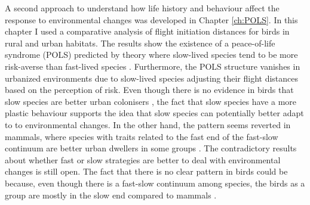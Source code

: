 A second approach to understand how life history and behaviour affect the
response to environmental changes was developed in Chapter \ref{ch:POLS}. In
this chapter I used a comparative analysis of flight initiation distances for
birds in rural and urban habitats. The results show the existence of a
peace-of-life syndrome (POLS) predicted by theory where slow-lived species tend
to be more risk-averse than fast-lived species \citep{Reale2010a}.
Furthermore, the POLS structure vanishes in urbanized environments due to
slow-lived species adjusting their flight distances based on the perception of
risk. Even though there is no evidence in birds that slow species are better
urban colonisers \citep{Sol2014}, the fact that slow species have a more plastic
behaviour supports the idea that slow species can potentially better adapt to
to environmental changes.
In the other hand, the pattern seems reverted in mammals, where species with
traits related to the fast end of the fast-slow continuum are better urban
dwellers in some groups \citep{Santini2019}.
The contradictory results about whether fast or slow strategies are better to
deal with environmental changes is still open. The fact that there is no clear
pattern in birds could be because, even though there is a fast-slow continuum
among species, the birds as a group are mostly in the slow end compared to
mammals \citep{Healy2014}.

\bigskip

